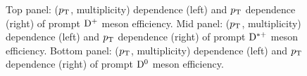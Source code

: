 \begin{figure}[!htp]
\caption{Top panel: ($p_{\rm T}$, multiplicity) dependence (left) and $p_{\rm T}$  dependence (right) of prompt ${\rm D^+}$ meson efficiency.
Mid panel: ($p_{\rm T}$, multiplicity) dependence (left) and $p_{\rm T}$  dependence (right) of prompt ${\rm D^{*+}}$ meson efficiency.
Bottom panel: ($p_{\rm T}$, multiplicity) dependence (left) and $p_{\rm T}$  dependence (right) of prompt ${\rm D^0}$ meson efficiency.
}
	\label{fig:dEffPrompt}	
\end{figure}

